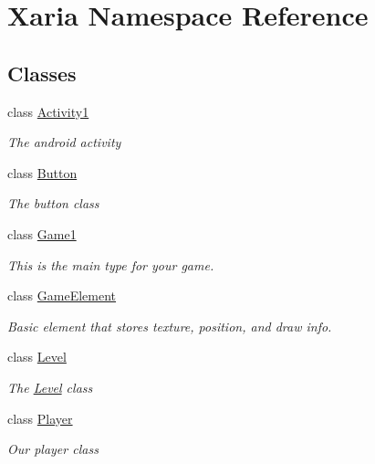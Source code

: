 \hypertarget{namespaceXaria}{}\section{Xaria Namespace Reference}
\label{namespaceXaria}
\subsection*{Classes}
\begin{DoxyCompactItemize}
\item 
class \hyperlink{classXaria_1_1Activity1}{Activity1}
\begin{DoxyCompactList}\small\item\em The android activity \end{DoxyCompactList}\item 
class \hyperlink{classXaria_1_1Button}{Button}
\begin{DoxyCompactList}\small\item\em The button class \end{DoxyCompactList}\item 
class \hyperlink{classXaria_1_1Game1}{Game1}
\begin{DoxyCompactList}\small\item\em This is the main type for your game. \end{DoxyCompactList}\item 
class \hyperlink{classXaria_1_1GameElement}{Game\+Element}
\begin{DoxyCompactList}\small\item\em Basic element that stores texture, position, and draw info. \end{DoxyCompactList}\item 
class \hyperlink{classXaria_1_1Level}{Level}
\begin{DoxyCompactList}\small\item\em The \hyperlink{classXaria_1_1Level}{Level} class \end{DoxyCompactList}\item 
class \hyperlink{classXaria_1_1Player}{Player}
\begin{DoxyCompactList}\small\item\em Our player class \end{DoxyCompactList}\end{DoxyCompactItemize}
